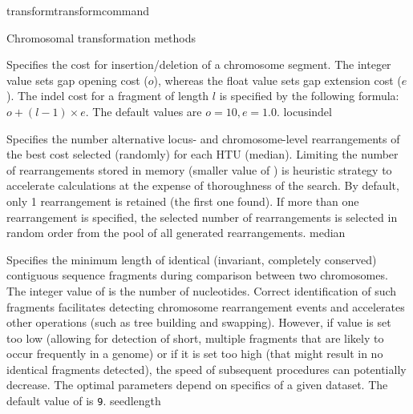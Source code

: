 \begin{command}{transform}{transformcommand}
\begin{arguments}
\begin{argumentgroup}{Chromosomal transformation methods}
\begin{description}
                        {Specifies the cost for insertion/deletion of a
                        chromosome segment. The integer value sets gap opening
                        cost ($o$), whereas the float value sets gap extension
                        cost ($e$).  The indel cost for a fragment of length $l$ is
                        specified by the following formula:
                       $o + (l-1) \times e$. The default values are $o=10, e=1.0$.}
                        {locusindel}

                        {Specifies the number alternative locus- and chromosome-level
                        rearrangements of the best cost selected (randomly) for
                        each HTU (median). Limiting the number of rearrangements
                        stored in memory (smaller value of )
                        is heuristic strategy to accelerate calculations at the
                        expense of thoroughness of the search. By default, only 1
                        rearrangement is retained (the first one found). If more than
                        one rearrangement is specified, the selected number of
                        rearrangements is selected in random order from the pool of
                        all generated rearrangements.}
                        {median}

                        {Specifies the minimum length of identical (invariant,
                        completely conserved) contiguous sequence fragments
                        during comparison between two chromosomes. The integer
                        value of  is the number of
                        nucleotides. Correct identification of such fragments
                        facilitates detecting chromosome rearrangement events and
                        accelerates other operations (such as tree building and
                        swapping). However, if  value
                        is set too low (allowing for detection of short, multiple
                        fragments that are likely to occur frequently in a genome) or
                        if it is set too high (that might result in no identical fragments
                        detected), the speed of subsequent procedures can potentially
                        decrease. The optimal parameters depend on specifics of a
                        given dataset.
                        The default value of  is \texttt{9}.}
                        {seedlength}
                        

\end{description}
\end{argumentgroup}
\end{arguments}
\end{command}

